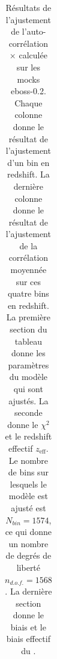\begin{table}[h]
  \centering
  \caption{Résultats de l'ajustement de l'auto-corrélation \lya{}$\times$\lya{} calculée sur les mocks eboss-0.2. Chaque colonne donne le résultat de l'ajustement d'un bin en redshift. La dernière colonne donne le résultat de l'ajustement de la corrélation moyennée sur ces quatre bins en redshift. La première section du tableau donne les paramètres du modèle qui sont ajustés. La seconde donne le $\chi^2$ et le redshift effectif $z_{\mathrm{eff}}$. Le nombre de bins sur lesquels le modèle est ajusté est $N_{bin} = \num{1574}$, ce qui donne un nombre de degrés de liberté $n_{d.o.f.} = \num{1568}$. La dernière section donne le biais et le biais effectif du \lya{}.}
  \label{tab:cf_eboss02_4bins}
  \footnotesize
  \begin{tabular}{lccccc}

\end{tabular}
\end{table}
